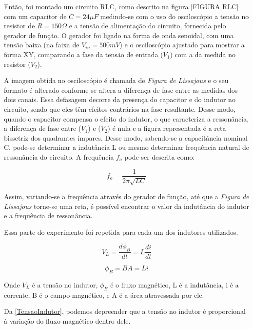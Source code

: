 \documentclass[11pt,a4paper]{article}
\begin{document}
    Então, foi montado um circuito RLC, como descrito na figura \cref{FIGURA RLC} com um capacitor de $C=24 \mu F$ medindo-se com o uso do osciloscópio a tensão no resistor de $R=150\Omega$ e a tensão de alimentação do circuito, fornecida pelo gerador de função. O gerador foi ligado na forma de onda senoidal, com uma tensão baixa (na faixa de $V_{in}=500mV$) e o osciloscópio ajustado para mostrar a forma XY, comparando a fase da tensão de entrada ($V_1$) com a da medida no resistor ($V_2$).
	
	A imagem obtida no osciloscópio é chamada de \textit{Figura de Lissajous} e o seu formato é alterado conforme se altera a diferença de fase entre as medidas dos dois canais. Essa defasagem decorre da presença do capacitor e do indutor no circuito, sendo que eles têm efeitos contrários na fase resultante. Desse modo, quando o capacitor compensa o efeito do indutor, o que caracteriza a ressonância, a diferença de fase entre ($V_1$) e ($V_2$) é nula e a figura representada é a reta bissetriz dos quadrantes ímpares. Desse modo, sabendo-se a capacitância nominal C, pode-se determinar a indutância L ou mesmo determinar frequência natural de ressonância do circuito. A frequência $f_o$ pode ser descrita como:

	\begin{equation}
        f_o = \dfrac{1}{2 \pi \sqrt{LC}}
	\label{fresson}
	\end{equation}

	Assim, variando-se a frequência através do gerador de função, até que a \textit{Figura de Lissajous} torne-se uma reta, é possível encontrar o valor da indutância do indutor e a frequência de ressonância.

	Essa parte do experimento foi repetida para cada um dos indutores utilizados.
	
	\begin{equation}
	    V_L = \dfrac{d \phi _B}{dt} = L \dfrac{di}{dt}
	    \label{TensaoIndutor}
	\end{equation}
	
	\begin{equation}
	    \phi _B = BA = Li
	    \label{FluxoMagnetico}
	\end{equation}
	
	Onde $V_L$ é a tensão no indutor, $\phi _B$ é o fluxo magnético, L é a indutância, i é a corrente, B é o campo magnético, e A é a área atravessada por ele.
	
	Da \cref{TensaoIndutor}, podemos depreender que a tensão no indutor é proporcional à variação do fluxo magnético dentro dele.
	
\end{document}
